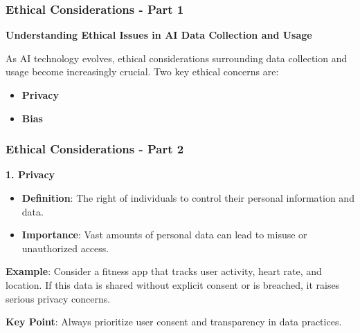 \documentclass[aspectratio=169]{beamer}
\begin{document}
\begin{frame}[fragile]
    \frametitle{Ethical Considerations - Part 1}
    \textbf{Understanding Ethical Issues in AI Data Collection and Usage}
    
    As AI technology evolves, ethical considerations surrounding data collection and usage become increasingly crucial. Two key ethical concerns are:
    
    \begin{itemize}
        \item \textbf{Privacy}
        \item \textbf{Bias}
    \end{itemize}
\end{frame}

\begin{frame}[fragile]
    \frametitle{Ethical Considerations - Part 2}

    \textbf{1. Privacy}
    
    \begin{itemize}
        \item \textbf{Definition}: The right of individuals to control their personal information and data.
        \item \textbf{Importance}: Vast amounts of personal data can lead to misuse or unauthorized access.
    \end{itemize}
    
    \textbf{Example}:
    Consider a fitness app that tracks user activity, heart rate, and location. If this data is shared without explicit consent or is breached, it raises serious privacy concerns.

    \textbf{Key Point}:
    Always prioritize user consent and transparency in data practices.
\end{frame}
\end{document}
